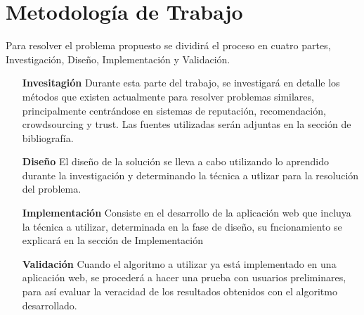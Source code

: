 \section{Metodología de Trabajo}

Para resolver el problema propuesto se dividirá el proceso en cuatro partes, Investigación, Diseño, Implementación y Validación.

\begin{itemize}
	\item[\textbf{Invesitagión}] Durante esta parte del trabajo, se investigará en detalle los métodos que existen actualmente para resolver problemas similares, principalmente centrándose en sistemas de reputación, recomendación, crowdsourcing y trust. Las fuentes utilizadas serán adjuntas en la sección de bibliografía.
	\item[\textbf{Diseño}] El diseño de la solución se lleva a cabo utilizando lo aprendido durante la investigación y determinando la técnica a utlizar para la resolución del problema. 
	\item[\textbf{Implementación}] Consiste en el desarrollo de la aplicación web que incluya la técnica a utilizar, determinada en la fase de diseño, su fncionamiento se explicará en la sección de Implementación
	\item[\textbf{Validación}] Cuando el algoritmo a utilizar ya está implementado en una aplicación web, se procederá a hacer una prueba con usuarios preliminares, para así evaluar la veracidad de los resultados obtenidos con el algoritmo desarrollado.

\end{itemize}
